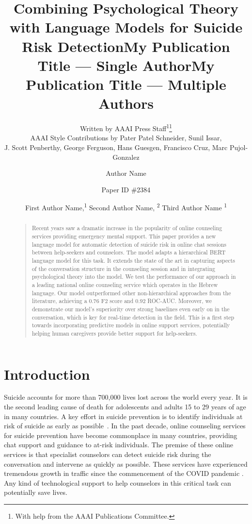 \documentclass[letterpaper]{article} %
\title{Combining Psychological Theory with Language Models for  Suicide Risk Detection}
\author{
    Written by AAAI Press Staff\textsuperscript{\rm 1}\thanks{With help from the AAAI Publications Committee.}\\
    AAAI Style Contributions by Pater Patel Schneider,
    Sunil Issar,\\
    J. Scott Penberthy,
    George Ferguson,
    Hans Guesgen,
    Francisco Cruz\equalcontrib,
    Marc Pujol-Gonzalez\equalcontrib
}
\title{My Publication Title --- Single Author}
\author {
    Author Name
}
\author{Paper ID \#2384}
\title{My Publication Title --- Multiple Authors}
\author {
    First Author Name,\textsuperscript{\rm 1}
    Second Author Name, \textsuperscript{\rm 2}
    Third Author Name \textsuperscript{\rm 1}
}
\begin{document}
\maketitle

\maketitle
\begin{abstract}
\begin{quote}
Recent years saw a dramatic increase in the popularity of online counseling services providing emergency mental support.
This paper provides a new language model for automatic detection of suicide risk in online chat sessions between help-seekers and counselors.
The model adapts a hierarchical BERT language model for this task. It  extends the state of the art in capturing aspects of the conversation structure in the counseling  session and  in
integrating psychological theory into the model.
We test the performance of our approach in a leading national online counseling service which operates in the Hebrew language.
Our model outperformed other non-hierarchical approaches from the literature, achieving a 0.76 F2 score and  0.92 ROC-AUC.  Moreover, we demonstrate our model’s superiority over strong baselines even early on in the conversation, which is key for real-time detection in the field.
This is a first step towards incorporating predictive models in online support services, potentially helping human caregivers provide better support for help-seekers.

\end{quote}
\end{abstract}

\section{Introduction}
Suicide  accounts for more than 700,000 lives lost across the world every year. It is the second leading cause of death for adolescents and adults 15 to 29 years of age in many countries.   A  key effort in suicide prevention is to  identify individuals at risk of suicide as early as possible~\cite{world2021live}.
In the past decade, online counseling services for  suicide prevention have become commonplace in many countries, providing chat support and guidance to at-risk individuals.  The premise of these online services is that specialist counselors can  detect suicide risk during the conversation and intervene as quickly as possible.   These services have experienced tremendous growth in traffic since the commencement of the  COVID pandemic \cite{zalsman2021suicide}. Any kind of technological support to help counselors in this critical task can potentially save lives.
\end{document}
